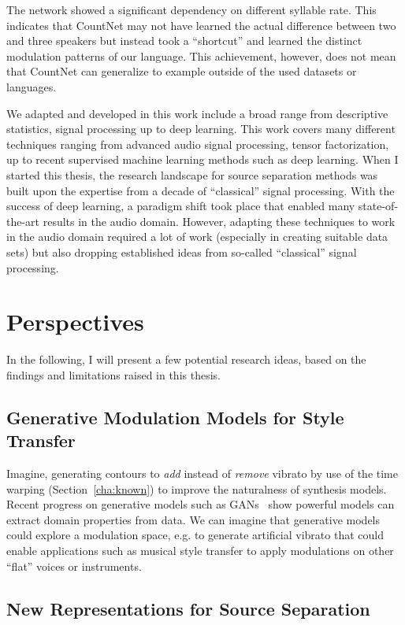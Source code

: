 The network showed a significant dependency on different syllable rate. This indicates that CountNet may not have learned the actual difference between two and three speakers but instead took a ``shortcut'' and learned the distinct modulation patterns of our language.
This achievement, however, does not mean that CountNet can generalize to example outside of the used datasets or languages. 
\par
We adapted and developed in this work include a broad range from descriptive statistics, signal processing up to deep learning.
This work covers many different techniques ranging from advanced audio signal processing, tensor factorization, up to recent supervised machine learning methods such as deep learning.
When I started this thesis, the research landscape for source separation methods was built upon the expertise from a decade of “classical” signal processing.
With the success of deep learning, a paradigm shift took place that enabled many state-of-the-art results in the audio domain. However, adapting these techniques to work in the audio domain required a lot of work (especially in creating suitable data sets) but also dropping established ideas from so-called “classical” signal processing.

\section{Perspectives}

In the following, I will present a few potential research ideas, based on the findings and limitations raised in this thesis.

\subsection*{Generative Modulation Models for Style Transfer}
Imagine, generating contours to \emph{add} instead of \emph{remove} vibrato by use of the time warping (Section~\ref{cha:known}) to improve the naturalness of synthesis models.
Recent progress on generative models such as GANs~\cite{goodfellow14} show powerful models can extract domain properties from data.
We can imagine that generative models could explore a modulation space, e.g. to generate artificial vibrato that could enable applications such as musical style transfer to apply modulations on other ``flat'' voices or instruments.

\subsection*{New Representations for Source Separation}

